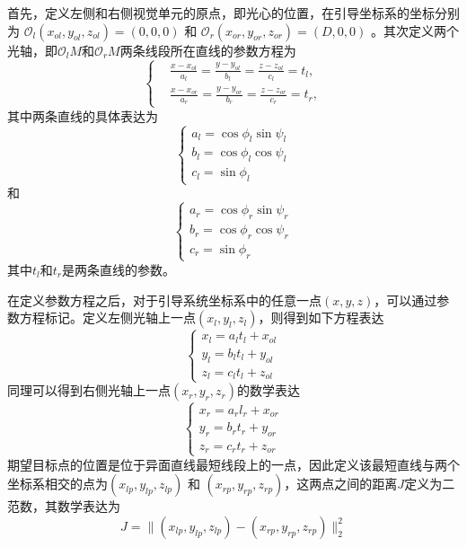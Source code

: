 首先，定义左侧和右侧视觉单元的原点，即光心的位置，在引导坐标系的坐标分别为 $\mathcal{O}_l(x_{ol}, y_{ol}, z_{ol})=(0, 0, 0)$ 和 $\mathcal{O}_r(x_{or}, y_{or}, z_{or})=(D, 0, 0)$ 。其次定义两个光轴，即$\mathcal{O}_lM$和$\mathcal{O}_rM$两条线段所在直线的参数方程为
\begin{equation}  
\left \{
\begin{split}
&\frac{x-x_{ol}}{a_l} = \frac{y-y_{ol}}{b_l} = \frac{z-z_{ol}}{c_l} = t_l,\\
&\frac{x-x_{or}}{a_r} = \frac{y-y_{or}}{b_r} = \frac{z-z_{or}}{c_r} = t_r,
\end{split}
\right.
\end{equation}
其中两条直线的具体表达为
\begin{equation}  
\left\{ 
\begin{array}{lll} 
a_l = \cos \phi_l \sin \psi_l\\
b_l = \cos \phi_l \cos \psi_l\\
c_l = \sin \phi_l
\end{array} 
\right.
\end{equation}
和
\begin{equation} 
\left\{ 
\begin{array}{lll} 
a_r = \cos \phi_r \sin \psi_r\\
b_r = \cos \phi_r \cos \psi_r\\
c_r = \sin \phi_r
\end{array} 
\right.
\end{equation}
其中$t_l$和$t_r$是两条直线的参数。

在定义参数方程之后，对于引导系统坐标系中的任意一点$(x,y,z)$，可以通过参数方程标记。定义左侧光轴上一点$(x_l,y_l,z_l)$，则得到如下方程表达
\begin{equation}  
\left\{ 
\begin{array}{lll} 
x_l = a_l t_l + x_{ol} \\
y_l = b_l t_l + y_{ol} \\
z_l = c_l t_l + z_{ol}
\end{array} 
\right.
\end{equation}
同理可以得到右侧光轴上一点$(x_r,y_r,z_r)$的数学表达
\begin{equation}  
\left\{ 
\begin{array}{lll} 
x_r = a_r l_r + x_{or} \\
y_r = b_r t_r + y_{or} \\
z_r = c_r t_r + z_{or}
\end{array} 
\right.
\end{equation}
期望目标点的位置是位于异面直线最短线段上的一点，因此定义该最短直线与两个坐标系相交的点为$(x_{lp}, y_{lp}, z_{lp})$ 和 $(x_{rp}, y_{rp}, z_{rp})$，这两点之间的距离$J$定义为二范数，其数学表达为
\begin{equation}
J = \|(x_{lp}, y_{lp}, z_{lp}) - (x_{rp}, y_{rp}, z_{rp}) \|_2^2
\end{equation}


